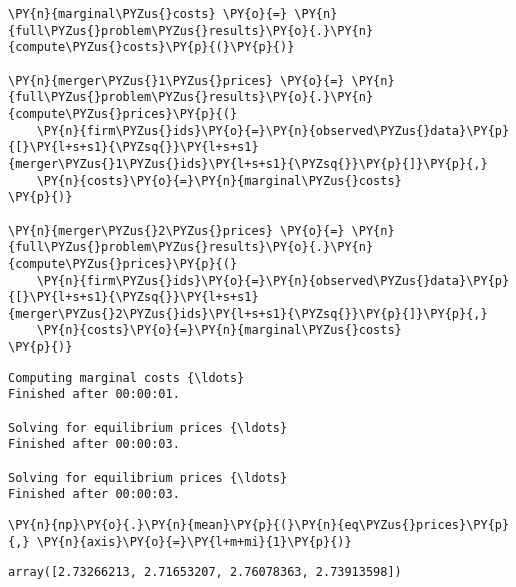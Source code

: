     \begin{tcolorbox}[breakable, size=fbox, boxrule=1pt, pad at break*=1mm,colback=cellbackground, colframe=cellborder]
\begin{Verbatim}[commandchars=\\\{\}]
\PY{n}{marginal\PYZus{}costs} \PY{o}{=} \PY{n}{full\PYZus{}problem\PYZus{}results}\PY{o}{.}\PY{n}{compute\PYZus{}costs}\PY{p}{(}\PY{p}{)}

\PY{n}{merger\PYZus{}1\PYZus{}prices} \PY{o}{=} \PY{n}{full\PYZus{}problem\PYZus{}results}\PY{o}{.}\PY{n}{compute\PYZus{}prices}\PY{p}{(}
    \PY{n}{firm\PYZus{}ids}\PY{o}{=}\PY{n}{observed\PYZus{}data}\PY{p}{[}\PY{l+s+s1}{\PYZsq{}}\PY{l+s+s1}{merger\PYZus{}1\PYZus{}ids}\PY{l+s+s1}{\PYZsq{}}\PY{p}{]}\PY{p}{,}
    \PY{n}{costs}\PY{o}{=}\PY{n}{marginal\PYZus{}costs}
\PY{p}{)}

\PY{n}{merger\PYZus{}2\PYZus{}prices} \PY{o}{=} \PY{n}{full\PYZus{}problem\PYZus{}results}\PY{o}{.}\PY{n}{compute\PYZus{}prices}\PY{p}{(}
    \PY{n}{firm\PYZus{}ids}\PY{o}{=}\PY{n}{observed\PYZus{}data}\PY{p}{[}\PY{l+s+s1}{\PYZsq{}}\PY{l+s+s1}{merger\PYZus{}2\PYZus{}ids}\PY{l+s+s1}{\PYZsq{}}\PY{p}{]}\PY{p}{,}
    \PY{n}{costs}\PY{o}{=}\PY{n}{marginal\PYZus{}costs}
\PY{p}{)}
\end{Verbatim}
\end{tcolorbox}

    \begin{Verbatim}[commandchars=\\\{\}]
Computing marginal costs {\ldots}
Finished after 00:00:01.

Solving for equilibrium prices {\ldots}
Finished after 00:00:03.

Solving for equilibrium prices {\ldots}
Finished after 00:00:03.

    \end{Verbatim}

    \begin{tcolorbox}[breakable, size=fbox, boxrule=1pt, pad at break*=1mm,colback=cellbackground, colframe=cellborder]
\begin{Verbatim}[commandchars=\\\{\}]
\PY{n}{np}\PY{o}{.}\PY{n}{mean}\PY{p}{(}\PY{n}{eq\PYZus{}prices}\PY{p}{,} \PY{n}{axis}\PY{o}{=}\PY{l+m+mi}{1}\PY{p}{)}
\end{Verbatim}
\end{tcolorbox}

            \begin{tcolorbox}[breakable, size=fbox, boxrule=.5pt, pad at break*=1mm, opacityfill=0]
\begin{Verbatim}[commandchars=\\\{\}]
array([2.73266213, 2.71653207, 2.76078363, 2.73913598])
\end{Verbatim}
\end{tcolorbox}


